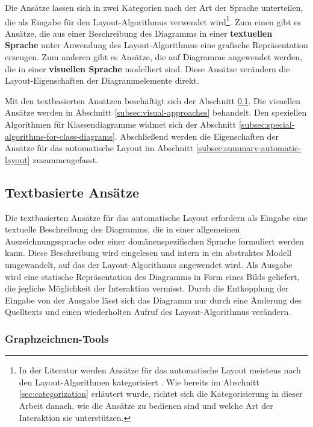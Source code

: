 Die Ansätze lassen sich in zwei Kategorien nach der Art der Sprache unterteilen, die als Eingabe für den Layout-Algorithmus verwendet wird\footnote{In der Literatur werden Ansätze für das automatische Layout meistens nach den Layout-Algorithmen kategorisiert \cite[S.39ff]{Fuhrmann11On-the-Pragmatics} \cite[S.32ff]{Eichelberger05Aesthetics}. Wie bereits im Abschnitt \ref{sec:categorization} erläutert wurde, richtet sich die Kategorisierung in dieser Arbeit danach, wie die Ansätze zu bedienen sind und welche Art der Interaktion sie unterstützen.}. Zum einen gibt es Ansätze, die aus einer Beschreibung des Diagramms in einer \textbf{textuellen Sprache} unter Anwendung des Layout-Algorithmus eine grafische Repräsentation erzeugen. Zum anderen gibt es Ansätze, die auf Diagramme angewendet werden, die in einer \textbf{visuellen Sprache} modelliert sind. Diese Ansätze verändern die Layout-Eigenschaften der Diagrammelemente direkt.

Mit den textbasierten Ansätzen beschäftigt sich der Abschnitt \ref{subsec:text-based-approaches}. Die visuellen Ansätze werden in Abschnitt \ref{subsec:visual-approaches} behandelt. Den speziellen Algorithmen für Klassendiagramme widmet sich der Abschnitt \ref{subsec:special-algorithms-for-class-diagrams}. Abschließend werden die Eigenschaften der Ansätze für das automatische Layout im Abschnitt \ref{subsec:summary-automatic-layout} zusammengefasst.

\subsection{Textbasierte Ansätze}
\label{subsec:text-based-approaches}

Die textbasierten Ansätze für das automatische Layout erfordern als Eingabe eine textuelle Beschreibung des Diagramms, die in einer allgemeinen Auszeichnungssprache oder einer domänenspezifischen Sprache formuliert werden kann. Diese Beschreibung wird eingelesen und intern in ein abstraktes Modell umgewandelt, auf das der Layout-Algorithmus angewendet wird. Als Ausgabe wird eine statische Repräsentation des Diagramms in Form eines Bilds geliefert, die jegliche Möglichkeit der Interaktion vermisst. Durch die Entkopplung der Eingabe von der Ausgabe lässt sich das Diagramm nur durch eine Änderung des Quelltexts und einen wiederholten Aufruf des Layout-Algorithmus verändern.

\subsubsection{Graphzeichnen-Tools}
\label{subsubsec:graph-drawing-tools}

